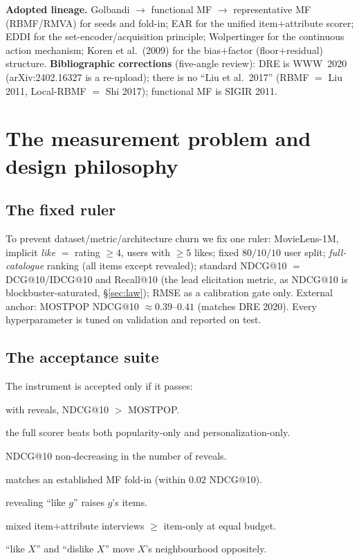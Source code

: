 \noindent\textbf{Adopted lineage.} Golbandi $\to$ functional MF $\to$ representative MF (RBMF/RMVA) for seeds and
fold-in; EAR for the unified item$+$attribute scorer; EDDI for the set-encoder/acquisition principle;
Wolpertinger for the continuous action mechanism; Koren et al.\ (2009) for the bias$+$factor (floor$+$residual)
structure. \textbf{Bibliographic corrections} (five-angle review): DRE is WWW~2020 (arXiv:2402.16327 is a
re-upload); there is no ``Liu et al.\ 2017'' (RBMF $=$ Liu 2011, Local-RBMF $=$ Shi 2017); functional MF is SIGIR
2011.

\section{The measurement problem and design philosophy}\label{sec:measure}

\subsection{The fixed ruler}
To prevent dataset/metric/architecture churn we fix one ruler: MovieLens-1M, implicit \emph{like} $=$ rating
$\ge 4$, users with $\ge 5$ likes; fixed $80/10/10$ user split; \emph{full-catalogue} ranking (all items except
revealed); standard NDCG@10 $=$ DCG@10/IDCG@10 and Recall@10 (the lead elicitation metric, as NDCG@10 is
blockbuster-saturated, \S\ref{sec:law}); RMSE as a calibration gate only. External anchor: MOSTPOP NDCG@10
$\approx 0.39$--$0.41$ (matches DRE 2020). Every hyperparameter is tuned on validation and reported on test.

\subsection{The acceptance suite}
The instrument is accepted only if it passes:
\begin{description}[leftmargin=2.2em,itemsep=1pt]
  \item[G1 beats-popularity] with reveals, NDCG@10 $>$ MOSTPOP.
  \item[G2 floor$+$residual law] the full scorer beats both popularity-only and personalization-only.
  \item[G3 monotonicity] NDCG@10 non-decreasing in the number of reveals.
  \item[G4 $\ge$MF] matches an established MF fold-in (within $0.02$ NDCG@10).
  \item[G5 attribute directionality] revealing ``like $g$'' raises $g$'s items.
  \item[G6 attribute value] mixed item$+$attribute interviews $\ge$ item-only at equal budget.
  \item[G7 polarity] ``like $X$'' and ``dislike $X$'' move $X$'s neighbourhood oppositely.
\end{description}

